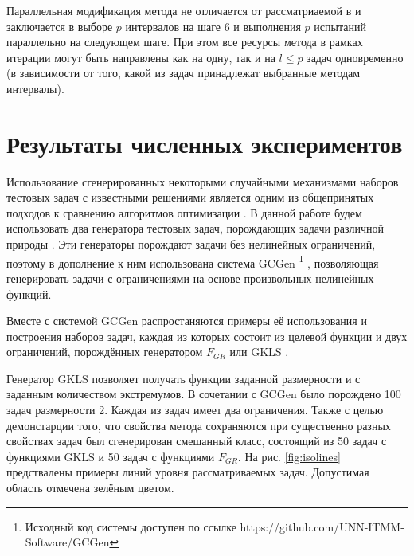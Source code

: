 \documentclass[11pt, oneside, a4paper]{article}
\begin{document}
Параллельная модификация метода не отличается от рассматриаемой в \cite{BarkalovStrongin2018}
и заключается в выборе \(p\) интервалов на шаге 6 и выполнения \(p\) испытаний параллельно
на следующем шаге. При этом все ресурсы метода в рамках итерации могут быть направлены как на одну, так и
на \(l\leqslant p\) задач одновременно (в зависимости от того, какой из задач принадлежат выбранные методам интервалы).

\section{Результаты численных экспериментов}

Использование сгенерированных некоторыми случайными механизмами
наборов тестовых задач с известными решениями является одним из общепринятых подходов
к сравнению алгоритмов оптимизации \cite{Beiranvand2017}. В данной работе
будем использовать два генератора тестовых задач, порождающих задачи различной природы \cite{grishaginClass, Gaviano2003}.
Эти генераторы порождают задачи без нелинейных ограничений, поэтому в дополнение к ним использована
система GCGen \footnote{Исходный код системы доступен по ссылке https://github.com/UNN-ITMM-Software/GCGen} \cite{GergelBarkalov2019}, позволяющая генерировать задачи с ограничениями на основе произвольных нелинейных
функций.

Вместе с системой GCGen распростаняются примеры её использования и построения
наборов задач, каждая из которых состоит из целевой функции и двух ограничений,
порождённых генератором \(F_{GR}\) \cite{grishaginClass} или GKLS \cite{Gaviano2003}.


Генератор GKLS \cite{Gaviano2003} позволяет получать функции заданной размерности и с заданным количеством экстремумов.
В сочетании с GCGen было порождено 100 задач размерности 2. Каждая из задач имеет два ограничения.
Также с целью демонстарции того, что свойства метода сохраняются при существенно разных свойствах задач
был сгенерирован смешанный класс, состоящий из 50 задач с функциями GKLS и 50 задач с функциями \(F_{GR}\).
На рис. \ref{fig:isolines} предствалены примеры линий уровня рассматриваемых задач. Допустимая область отмечена зелёным цветом.
\end{document}
